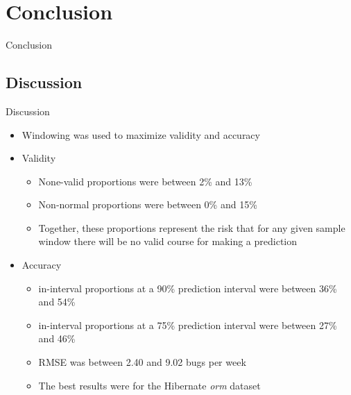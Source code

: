 \documentclass[presentation]{beamer}
\begin{document}
\section{Conclusion}

\begin{frame}
\begin{center}
\Large{Conclusion}
\end{center}
\end{frame}

\subsection{Discussion}

\begin{frame}[t]{Discussion}
\begin{itemize}
\item{Windowing was used to maximize validity and accuracy}
\item{Validity
\begin{itemize}
\item{None-valid proportions were between 2\% and 13\%}
\item{Non-normal proportions were between 0\% and 15\%}
\item{Together, these proportions represent the risk that for any given sample
window there will be no valid course for making a prediction}
\end{itemize}}
\item{Accuracy
\begin{itemize}
\item{in-interval proportions at a 90\% prediction interval were between 36\% and 54\%}
\item{in-interval proportions at a 75\% prediction interval were between 27\% and 46\%}
\item{RMSE was between 2.40 and 9.02 bugs per week}
\item{The best results were for the Hibernate \textit{orm} dataset}
\end{itemize}
}
\end{itemize}
\end{frame}
\end{document}
